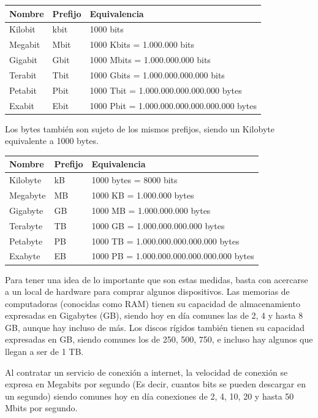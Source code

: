 \begin{tabular}{l l l}
    Nombre   &  Prefijo  & Equivalencia\\
    \hline
    Kilobit  &  kbit     & 1000 bits \\
    Megabit  &  Mbit     & 1000 Kbits = 1.000.000 bits\\
    Gigabit  &  Gbit     & 1000 Mbits = 1.000.000.000 bits\\
    Terabit  &  Tbit     & 1000 Gbits = 1.000.000.000.000 bits\\
    Petabit  &  Pbit     & 1000 Tbit = 1.000.000.000.000.000 bytes\\
    Exabit   &  Ebit     & 1000 Pbit = 1.000.000.000.000.000.000 bytes\\
\end{tabular}

Los bytes también son sujeto de los mismos prefijos, siendo un Kilobyte
equivalente a 1000 bytes.\autocite{laplante_2000}

\begin{tabular}{l l l}
    Nombre   &  Prefijo  & Equivalencia\\
    \hline
    Kilobyte  &  kB     & 1000 bytes = 8000 bits \\
    Megabyte  &  MB     & 1000 KB = 1.000.000 bytes\\
    Gigabyte  &  GB     & 1000 MB = 1.000.000.000 bytes\\
    Terabyte  &  TB     & 1000 GB = 1.000.000.000.000 bytes\\
    Petabyte  &  PB     & 1000 TB = 1.000.000.000.000.000 bytes\\
    Exabyte   &  EB     & 1000 PB = 1.000.000.000.000.000.000 bytes\\
\end{tabular}

Para tener una idea de lo importante que son estas medidas, basta con acercarse
a un local de hardware para comprar algunos dispositivos. Las memorias de
computadoras (conocidas como RAM) tienen su capacidad de almacenamiento
expresadas en Gigabytes (GB), siendo hoy en día comunes las de 2, 4 y hasta 8 GB,
aunque hay incluso de más. Los discos rígidos también tienen su capacidad
expresadas en GB, siendo comunes los de 250, 500, 750, e incluso hay algunos
que llegan a ser de 1 TB.

Al contratar un servicio de conexión a internet, la velocidad de conexión se
expresa en Megabits por segundo (Es decir, cuantos bits se pueden descargar en
un segundo) siendo comunes hoy en día conexiones de 2, 4, 10, 20 y hasta
50 Mbits por segundo.

